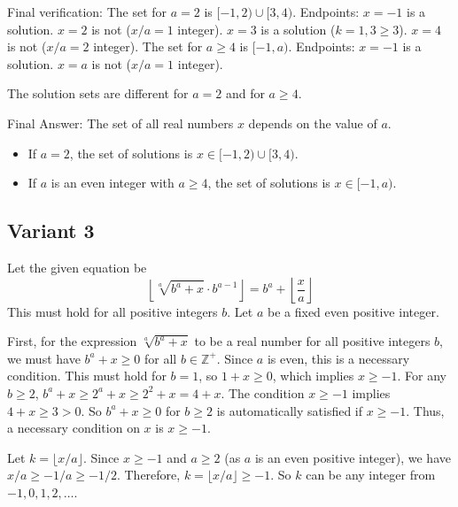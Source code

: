 \documentclass[12pt,a4paper]{article}
\theoremstyle{definition}
\begin{document}
    Final verification:
    The set for $a=2$ is $[-1,2) \cup [3,4)$. Endpoints: $x=-1$ is a solution. $x=2$ is not ($x/a=1$ integer). $x=3$ is a solution ($k=1, 3 \geq 3$). $x=4$ is not ($x/a=2$ integer).
    The set for $a \geq 4$ is $[-1,a)$. Endpoints: $x=-1$ is a solution. $x=a$ is not ($x/a=1$ integer).

    The solution sets are different for $a=2$ and for $a \geq 4$.

    Final Answer:
    The set of all real numbers $x$ depends on the value of $a$.
    \begin{itemize}
        \item If $a=2$, the set of solutions is $x \in [-1, 2) \cup [3, 4)$.
        \item If $a$ is an even integer with $a \geq 4$, the set of solutions is $x \in [-1, a)$.
    \end{itemize}

    \subsection{Variant 3}
        Let the given equation be
        \[ \left\lfloor \sqrt[a]{b^a + x} \cdot b^{a-1} \right\rfloor = b^a + \left\lfloor \frac{x}{a} \right\rfloor \]
        This must hold for all positive integers $b$. Let $a$ be a fixed even positive integer.

        First, for the expression $\sqrt[a]{b^a + x}$ to be a real number for all positive integers $b$, we must have $b^a + x \geq 0$ for all $b \in \mathbb{Z}^+$. Since $a$ is even, this is a necessary condition.
        This must hold for $b=1$, so $1+x \geq 0$, which implies $x \geq -1$.
        For any $b \geq 2$, $b^a+x \geq 2^a+x \geq 2^2+x = 4+x$. The condition $x \geq -1$ implies $4+x \geq 3 > 0$. So $b^a+x \geq 0$ for $b \geq 2$ is automatically satisfied if $x \geq -1$.
        Thus, a necessary condition on $x$ is $x \geq -1$.

        Let $k = \lfloor x/a \rfloor$. Since $x \geq -1$ and $a \geq 2$ (as $a$ is an even positive integer), we have $x/a \geq -1/a \geq -1/2$. Therefore, $k = \lfloor x/a \rfloor \geq -1$. So $k$ can be any integer from $-1, 0, 1, 2, \ldots$.
\end{document}
